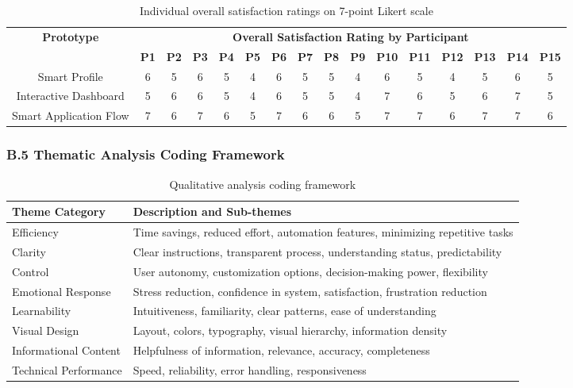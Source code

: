 \documentclass[
	letterpaper, %
]{jdf}
\begin{document}
\begin{table}[h]
\centering
\begin{tabular}{|c|c|c|c|c|c|c|c|c|c|c|c|c|c|c|c|}
\hline
\multirow{2}{*}{\textbf{Prototype}} & \multicolumn{15}{c|}{\textbf{Overall Satisfaction Rating by Participant}} \\
\cline{2-16}
 & \textbf{P1} & \textbf{P2} & \textbf{P3} & \textbf{P4} & \textbf{P5} & \textbf{P6} & \textbf{P7} & \textbf{P8} & \textbf{P9} & \textbf{P10} & \textbf{P11} & \textbf{P12} & \textbf{P13} & \textbf{P14} & \textbf{P15} \\
\hline
Smart Profile & 6 & 5 & 6 & 5 & 4 & 6 & 5 & 5 & 4 & 6 & 5 & 4 & 5 & 6 & 5 \\
\hline
Interactive Dashboard & 5 & 6 & 6 & 5 & 4 & 6 & 5 & 5 & 4 & 7 & 6 & 5 & 6 & 7 & 5 \\
\hline
Smart Application Flow & 7 & 6 & 7 & 6 & 5 & 7 & 6 & 6 & 5 & 7 & 7 & 6 & 7 & 7 & 6 \\
\hline
\end{tabular}
\caption{Individual overall satisfaction ratings on 7-point Likert scale}
\end{table}

\subsubsection{B.5 Thematic Analysis Coding Framework}

\begin{table}[h]
\centering
\begin{tabular}{|l|p{10cm}|}
\hline
\textbf{Theme Category} & \textbf{Description and Sub-themes} \\
\hline
Efficiency & Time savings, reduced effort, automation features, minimizing repetitive tasks \\
\hline
Clarity & Clear instructions, transparent process, understanding status, predictability \\
\hline
Control & User autonomy, customization options, decision-making power, flexibility \\
\hline
Emotional Response & Stress reduction, confidence in system, satisfaction, frustration reduction \\
\hline
Learnability & Intuitiveness, familiarity, clear patterns, ease of understanding \\
\hline
Visual Design & Layout, colors, typography, visual hierarchy, information density \\
\hline
Informational Content & Helpfulness of information, relevance, accuracy, completeness \\
\hline
Technical Performance & Speed, reliability, error handling, responsiveness \\
\hline
\end{tabular}
\caption{Qualitative analysis coding framework}
\end{table}
\end{document}
